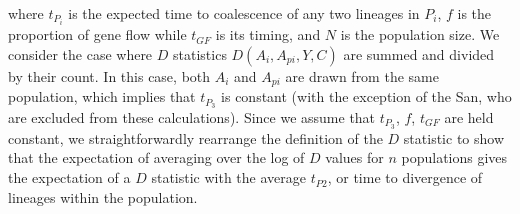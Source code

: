 \documentclass{article}
\begin{document}
where $t_{P_i}$ is the expected time to coalescence of any two lineages in $P_i$, $f$ is the proportion of gene flow while $t_{GF}$ is its timing, and $N$ is the population size. We consider the case where $D$ statistics $D(A_i, A_{pi}, Y, C)$ are summed and divided by their count. In this case, both $A_i$ and $A_{pi}$ are drawn from the same population, which implies that $t_{P_3}$ is constant (with the exception of the San, who are excluded from these calculations). Since we assume that $t_{P_3}$, $f$, $t_{GF}$ are held constant, we straightforwardly rearrange the definition of the $D$ statistic to show that the expectation of averaging over the log of $D$ values for $n$ populations gives the expectation of a $D$ statistic with the average $t_{P2}$, or time to divergence of lineages within the population.  

\resizebox{.75\linewidth}{!}{
	\begin{minipage}{\linewidth}
	$$ \begin{aligned}
	\mathbb{E} [\frac{1}{n} \sum^n_i \ln D(P2, P1, P0, O)] &= \frac{1}{n} \sum^n_i \mathbb{E}[ \ln D(P2, P1, P0, O)] \\
	&= \frac{1}{n} \sum^n_i \ln \frac{3f[t_{P3} - t_{GF}]}{3f [t_{P3} - t_{GF}] + 4N(1-f) (1 - \frac{1}{2N})^{t_{P3}-  t_{P2}} + 4Nf (1 - \frac{1}{2N})^{t_{P3}-t_{GF}}} \\
	&= \frac{1}{n} \sum^n_i \ln \left( 3f[t_{P3} - t_{GF} \right) - \ln ( 3f [t_{P3} - t_{GF}] + 4N(1-f) (1 - \frac{1}{2N})^{t_{P3}-  t_{P2}} \\  &+ 4Nf (1 - \frac{1}{2N})^{t_{P3}-t_{GF}}) \\
	&= \frac{1}{n} \sum^n_i \ln \left( 3f[t_{P3} - t_{GF} \right) - \ln \left( 3f [t_{P3} - t_{GF}] \right) + \ln \left( 4N(1-f) (1 - \frac{1}{2N})^{t_{P3}-  t_{P2}} \right) \\  &- \ln \left( 4Nf (1 - \frac{1}{2N})^{t_{P3}-t_{GF}} \right) \\
	&= \frac{1}{n} \left( n \left( \ln \left( 3f[t_{P3} - t_{GF} \right) + \ln \left( 3f [t_{P3} - t_{GF}] \right) +  + \ln \left( 4Nf (1 - \frac{1}{2N})^{t_{P3}-t_{GF}} \right) \right) \right) \\ &+ \sum^n_i \ln \left( 4N(1-f) (1 - \frac{1}{2N})^{t_{P3}-  t_{P2}} \right) \\
	&= \ldots \sum^n_i (t_{P3}-  t_{P2} ) \ln \left( 4N(1-f) (1 - \frac{1}{2N}) \right) \\
	&= \ldots n \ln \left( 4N(1-f) (1 - \frac{1}{2N}) \right) \sum^n_i (t_{P3}-  t_{P2} ) \\
	&= \ldots n \ln \left( 4N(1-f) (1 - \frac{1}{2N}) \right) \left( \sum^n_i t_{P3} - \sum^n_i t_{P2} \right) \\

\end{aligned}$$
\end{minipage}}
\end{document}
